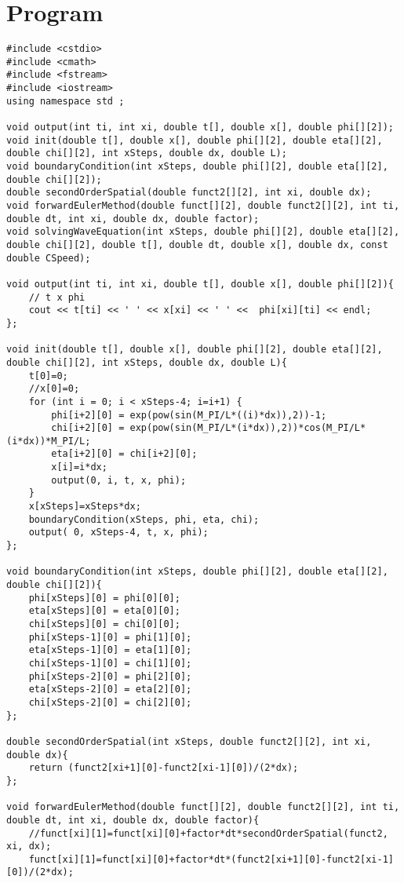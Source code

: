 \documentclass[10pt,fleqn,reqno,a4paper]{article}
\begin{document}
\section{Program}
\begin{verbatim}
#include <cstdio>
#include <cmath>
#include <fstream>
#include <iostream>
using namespace std ;

void output(int ti, int xi, double t[], double x[], double phi[][2]);
void init(double t[], double x[], double phi[][2], double eta[][2], double chi[][2], int xSteps, double dx, double L);
void boundaryCondition(int xSteps, double phi[][2], double eta[][2], double chi[][2]);
double secondOrderSpatial(double funct2[][2], int xi, double dx);
void forwardEulerMethod(double funct[][2], double funct2[][2], int ti, double dt, int xi, double dx, double factor);
void solvingWaveEquation(int xSteps, double phi[][2], double eta[][2], double chi[][2], double t[], double dt, double x[], double dx, const double CSpeed);

void output(int ti, int xi, double t[], double x[], double phi[][2]){
    // t x phi
    cout << t[ti] << ' ' << x[xi] << ' ' <<  phi[xi][ti] << endl;
};

void init(double t[], double x[], double phi[][2], double eta[][2], double chi[][2], int xSteps, double dx, double L){
    t[0]=0;
    //x[0]=0;
    for (int i = 0; i < xSteps-4; i=i+1) {
        phi[i+2][0] = exp(pow(sin(M_PI/L*((i)*dx)),2))-1;
        chi[i+2][0] = exp(pow(sin(M_PI/L*(i*dx)),2))*cos(M_PI/L*(i*dx))*M_PI/L;
        eta[i+2][0] = chi[i+2][0];
        x[i]=i*dx;
        output(0, i, t, x, phi);
	}
	x[xSteps]=xSteps*dx;
    boundaryCondition(xSteps, phi, eta, chi);
    output( 0, xSteps-4, t, x, phi);
};

void boundaryCondition(int xSteps, double phi[][2], double eta[][2], double chi[][2]){
    phi[xSteps][0] = phi[0][0];
    eta[xSteps][0] = eta[0][0];
    chi[xSteps][0] = chi[0][0];
    phi[xSteps-1][0] = phi[1][0];
    eta[xSteps-1][0] = eta[1][0];
    chi[xSteps-1][0] = chi[1][0];
    phi[xSteps-2][0] = phi[2][0];
    eta[xSteps-2][0] = eta[2][0];
    chi[xSteps-2][0] = chi[2][0];
};

double secondOrderSpatial(int xSteps, double funct2[][2], int xi, double dx){
    return (funct2[xi+1][0]-funct2[xi-1][0])/(2*dx);
};

void forwardEulerMethod(double funct[][2], double funct2[][2], int ti, double dt, int xi, double dx, double factor){
    //funct[xi][1]=funct[xi][0]+factor*dt*secondOrderSpatial(funct2, xi, dx);
    funct[xi][1]=funct[xi][0]+factor*dt*(funct2[xi+1][0]-funct2[xi-1][0])/(2*dx);


\end{verbatim}
\end{document}
